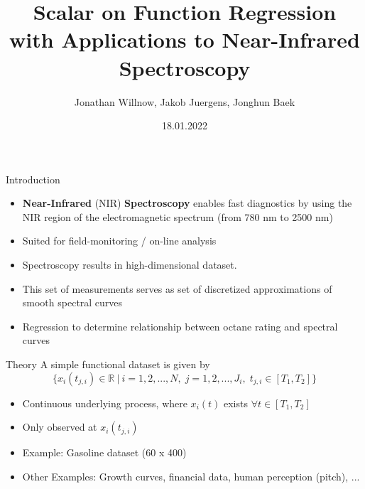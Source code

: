 \documentclass{beamer}
\title{Scalar on Function Regression \\
with Applications to Near-Infrared Spectroscopy}
\author{Jonathan Willnow, Jakob Juergens, Jonghun Baek}
\date{18.01.2022}
\begin{document}
	
	\begin{frame}
		\titlepage 
	\end{frame}
	
	\logo{}
	
	
	\begin{frame}{Introduction}
	
		\begin{itemize}
			\item \textbf{Near-Infrared} (NIR) \textbf{Spectroscopy} enables fast diagnostics by using the NIR region of the electromagnetic spectrum (from 780 nm to 2500 nm)
			\item Suited for field-monitoring / on-line analysis
			\item Spectroscopy results in high-dimensional dataset.	
			\item This set of measurements serves as set of discretized approximations of smooth spectral curves
			\item Regression to determine relationship between octane rating and spectral curves
			\end{itemize}
	\end{frame}
	
	\begin{frame}{Theory}
		A simple functional dataset is given by 
		$$\{x_{i}(t_{j,i}) \in \mathbb{R} \: \vert \: i = 1,2,...,N, \; j = 1,2,..., J_i, \; t_{j,i} \in [T_1, T_2] \}$$
		
		\begin{itemize}
			\item Continuous underlying process, where $x_i(t)$ exists $\forall t \in [T_1, T_2]$
			\item Only observed at $x_{i}(t_{j,i})$
			\item Example: Gasoline dataset (60 x 400)
			\item Other Examples: Growth curves, financial data, human perception (pitch), ...
			
		\end{itemize}
	\end{frame}

\end{document}
